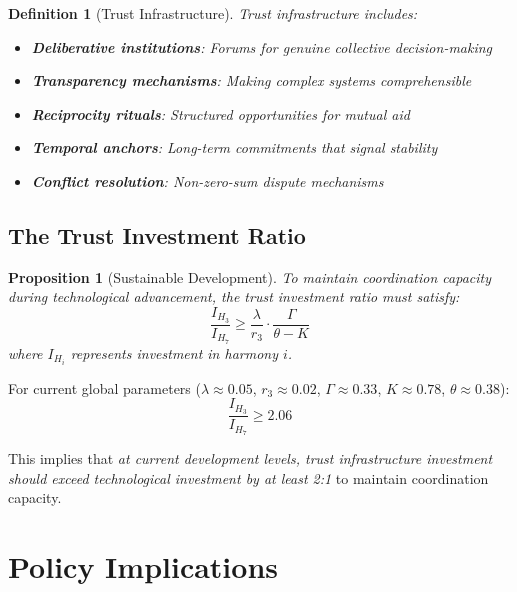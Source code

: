 \documentclass[11pt,a4paper]{article}
\newtheorem{proposition}{Proposition}
\newtheorem{definition}{Definition}
\begin{document}
\begin{definition}[Trust Infrastructure]
Trust infrastructure includes:
\begin{itemize}
    \item \textbf{Deliberative institutions}: Forums for genuine collective decision-making
    \item \textbf{Transparency mechanisms}: Making complex systems comprehensible
    \item \textbf{Reciprocity rituals}: Structured opportunities for mutual aid
    \item \textbf{Temporal anchors}: Long-term commitments that signal stability
    \item \textbf{Conflict resolution}: Non-zero-sum dispute mechanisms
\end{itemize}
\end{definition}

\subsection{The Trust Investment Ratio}

\begin{proposition}[Sustainable Development]
To maintain coordination capacity during technological advancement, the trust investment ratio must satisfy:
\begin{equation}
\frac{I_{H_3}}{I_{H_7}} \geq \frac{\lambda}{r_3} \cdot \frac{\Gamma}{\theta - K}
\end{equation}
where $I_{H_i}$ represents investment in harmony $i$.
\end{proposition}

For current global parameters ($\lambda \approx 0.05$, $r_3 \approx 0.02$, $\Gamma \approx 0.33$, $K \approx 0.78$, $\theta \approx 0.38$):
\begin{equation}
\frac{I_{H_3}}{I_{H_7}} \geq 2.06
\end{equation}

This implies that \textit{at current development levels, trust infrastructure investment should exceed technological investment by at least 2:1} to maintain coordination capacity.

\section{Policy Implications}
\end{document}
